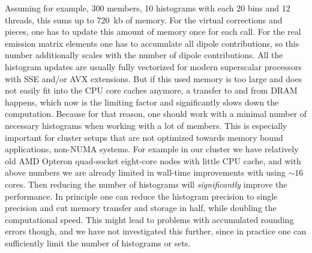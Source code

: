  Assuming for example, 300 \PDF{} members,
10 histograms with each 20 bins and 12 threads, this sums up to \SI{720}{kb} of memory. For the
virtual corrections and \LO{} pieces, one has to update this amount of memory once for each call. For the real
emission matrix elements one has to accumulate all dipole contributions, so this number additionally scales
with the number of dipole contributions. All the histogram updates are usually fully vectorized for modern 
superscalar processors with SSE and/or AVX extensions. But if this used memory is too large and does not easily fit 
into the 
CPU core caches anymore, a transfer to and from DRAM happens, which now is the limiting factor and significantly slows
down the computation. Because for that reason, one should work with a minimal number of necessary histograms when 
working
with a lot of \PDF{} members. This is especially important for cluster setups that are not optimized towards
memory bound applications, non-NUMA systems. For example in our cluster we have relatively old AMD Opteron quad-socket 
eight-core nodes with little CPU cache, and with above numbers we are already limited in wall-time improvements with 
using $\sim16$ cores. Then reducing 
the number of histograms will \emph{significantly} improve the performance. In principle one can reduce the histogram 
precision to single precision and cut memory transfer and storage in half, while doubling the computational speed. This 
might lead to problems with accumulated rounding errors though, and we have not investigated this further, since in
practice one can sufficiently limit the number of histograms or \PDF{} sets.
